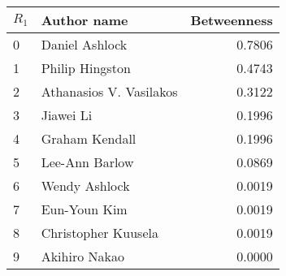 \begin{tabular}{llr}
\toprule
\(R_1\) &              Author name &  Betweenness \\
\midrule
0 &           Daniel Ashlock &                0.7806 \\
1 &          Philip Hingston &                0.4743 \\
2 &  Athanasios V. Vasilakos &                0.3122 \\
3 &                Jiawei Li &                0.1996 \\
4 &           Graham Kendall &                0.1996 \\
5 &           Lee-Ann Barlow &                0.0869 \\
6 &            Wendy Ashlock &                0.0019 \\
7 &             Eun-Youn Kim &                0.0019 \\
8 &      Christopher Kuusela &                0.0019 \\
9 &            Akihiro Nakao &                0.0000 \\
\bottomrule
\end{tabular}
